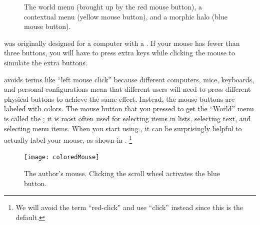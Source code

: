 \documentclass[a4paper,10pt,twoside]{book}
\begin{document}
\begin{figure}[tbh]
	\centering
	\hfill
	\hfill
	\begin{center}
	\vspace{-4.75cm}
    \vspace{1.25cm}
	\end{center}
	\caption{The world menu (brought up by the red mouse button), a contextual menu (yellow mouse button), and a morphic halo (blue mouse button).\label{fig:threeButtons}}
\end{figure}

\sq was originally designed for a computer with a .
If your mouse has fewer than three buttons, you will have to press extra keys while clicking the mouse to simulate the extra buttons.

\sq avoids terms like ``left mouse click'' because different computers, mice, keyboards, and personal configurations mean that different users will need to press different physical buttons to achieve the same effect.
Instead, the mouse buttons are labeled with colors.
The mouse button that you pressed to get the ``World'' menu is called the ; it is most often used for selecting items in lists, selecting text, and selecting menu items.
When you start using \sq, it can be surprisingly helpful to actually label your mouse, as shown in .%
\footnote{We will avoid the term ``red-click'' and use ``click'' instead since this is the default.}

\begin{figure}
\texttt{[image: coloredMouse]}
\caption{The author's mouse.
	Clicking the scroll wheel activates the blue button.}
\label{fig:coloredMouse}
\end{figure}
\end{document}
